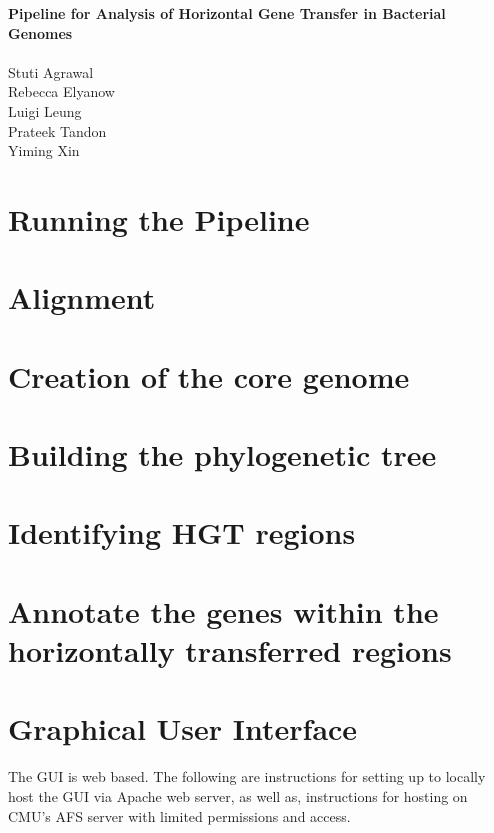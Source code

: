 \documentclass[11pt]{article}
\begin{document}
\begin{center}
\textbf{\LARGE{Pipeline for Analysis of Horizontal Gene Transfer in Bacterial Genomes}}\\
~~~\\
\Large{Stuti Agrawal}\\
\Large{Rebecca Elyanow}\\
\Large{Luigi Leung}\\
\Large{Prateek Tandon}\\
\Large{Yiming Xin}
\end{center}
\tableofcontents

%

\section{Running the Pipeline}


\section{Alignment}


\section{Creation of the core genome}


\section{Building the phylogenetic tree}


\section{Identifying HGT regions}


\section{Annotate the genes within the horizontally transferred regions}



\section{Graphical User Interface}
The GUI is web based. The following are instructions for setting up to locally host the GUI via Apache web server, as well as, instructions for hosting on CMU's AFS server with limited permissions and access.
\end{document}
